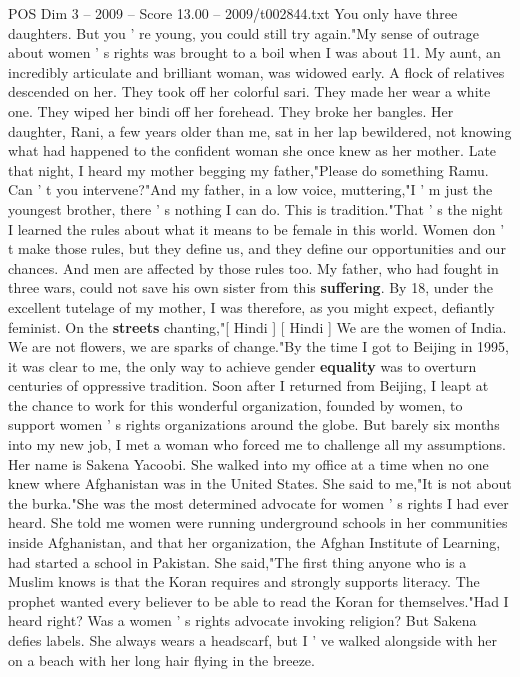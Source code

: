 \begin{textsample}{POS Dim 3 – 2009 – Score 13.00 – 2009/t002844.txt}
You only have three daughters.
But you ' re young, you could still try again."My sense of outrage about women ' s rights was brought to a boil when I was about 11.
My aunt, an incredibly articulate and brilliant woman, was widowed early.
A flock of relatives descended on her.
They took off her colorful sari.
They made her wear a white one.
They wiped her bindi off her forehead.
They broke her bangles.
Her daughter, Rani, a few years older than me, sat in her lap bewildered, not knowing what had happened to the confident woman she once knew as her mother.
Late that night, I heard my mother begging my father,"Please do something Ramu.
Can ' t you intervene?"And my father, in a low voice, muttering,"I ' m just the youngest brother, there ' s nothing I can do.
This is tradition."That ' s the night I learned the rules about what it means to be female in this world.
Women don ' t make those rules, but they define us, and they define our opportunities and our chances.
And men are affected by those rules too.
My father, who had fought in three wars, could not save his own sister from this \textbf{suffering}.
By 18, under the excellent tutelage of my mother, I was therefore, as you might expect, defiantly feminist.
On the \textbf{streets} chanting,"[ Hindi ] [ Hindi ] We are the women of India.
We are not flowers, we are sparks of change."By the time I got to Beijing in 1995, it was clear to me, the only way to achieve gender \textbf{equality} was to overturn centuries of oppressive tradition.
Soon after I returned from Beijing, I leapt at the chance to work for this wonderful organization, founded by women, to support women ' s rights organizations around the globe.
But barely six months into my new job, I met a woman who forced me to challenge all my assumptions.
Her name is Sakena Yacoobi.
She walked into my office at a time when no one knew where Afghanistan was in the United States.
She said to me,"It is not about the burka."She was the most determined advocate for women ' s rights I had ever heard.
She told me women were running underground schools in her communities inside Afghanistan, and that her organization, the Afghan Institute of Learning, had started a school in Pakistan.
She said,"The first thing anyone who is a Muslim knows is that the Koran requires and strongly supports literacy.
The prophet wanted every believer to be able to read the Koran for themselves."Had I heard right?
Was a women ' s rights advocate invoking religion?
But Sakena defies labels.
She always wears a headscarf, but I ' ve walked alongside with her on a beach with her long hair flying in the breeze.

\end{textsample}
